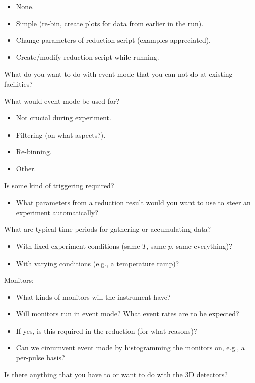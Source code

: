 \documentclass[a4paper,english,numbers=noenddot,bibliography=totoc,chapterprefix=on,DIV=12]{scrartcl}
\begin{document}
\begin{enumerate}
\begin{itemize}
      \item None.
      \item Simple (re-bin, create plots for data from earlier in the run).
      \item Change parameters of reduction script (examples appreciated).
      \item Create/modify reduction script while running.
    \end{itemize}
  \item What do you want to do with event mode that you can not do at existing facilities?
  \item What would event mode be used for?
    \begin{itemize}
      \item Not crucial during experiment.
      \item Filtering (on what aspects?).
      \item Re-binning.
      \item Other.
    \end{itemize}
  \item Is some kind of triggering required?
    \begin{itemize}
      \item What parameters from a reduction result would you want to use to steer an experiment automatically?
    \end{itemize}
  \item What are typical time periods for gathering or accumulating data?
    \begin{itemize}
      \item With fixed experiment conditions (same $T$, same $p$, same everything)?
      \item With varying conditions (e.g., a temperature ramp)?
    \end{itemize}
  {\color{black!60}
  \item Monitors:
    \begin{itemize}
      \item What kinds of monitors will the instrument have?
      \item Will monitors run in event mode?
        What event rates are to be expected?
      \item If yes, is this required in the reduction (for what reasons)?
      \item Can we circumvent event mode by histogramming the monitors on, e.g., a per-pulse basis?
    \end{itemize}
  }
  {\color{black!60}
  \item Is there anything that you have to or want to do with the 3D detectors?
}
\end{enumerate}
\end{document}
